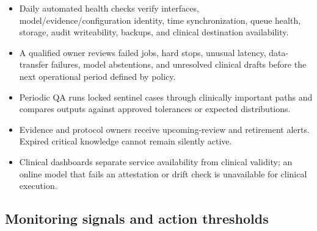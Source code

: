 \documentclass[11pt,letterpaper]{article}
\begin{document}
\begin{itemize}
\item Daily automated health checks verify interfaces, model\slash\allowbreak{}evidence\slash\allowbreak{}configuration identity, time synchronization, queue health, storage, audit writeability, backups, and clinical destination availability.
\item A qualified owner reviews failed jobs, hard stops, unusual latency, data-transfer failures, model abstentions, and unresolved clinical drafts before the next operational period defined by policy.
\item Periodic QA runs locked sentinel cases through clinically important paths and compares outputs against approved tolerances or expected distributions.
\item Evidence and protocol owners receive upcoming-review and retirement alerts. Expired critical knowledge cannot remain silently active.
\item Clinical dashboards separate service availability from clinical validity; an online model that fails an attestation or drift check is unavailable for clinical execution.
\end{itemize}

\subsection{Monitoring signals and action thresholds}
\end{document}
